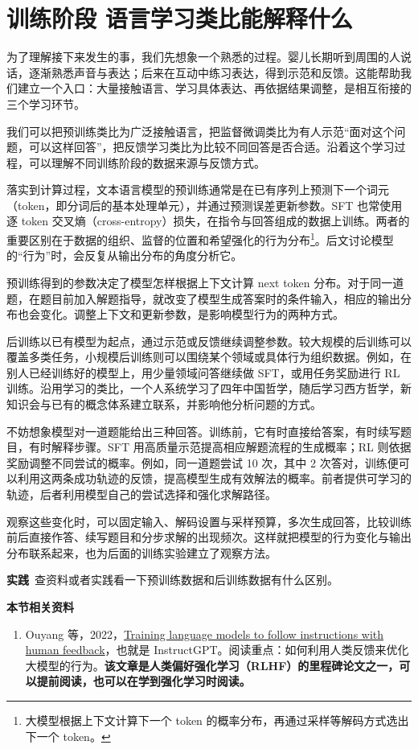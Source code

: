 \section{训练阶段 语言学习类比能解释什么}\label{训练阶段 语言学习类比能解释什么}

为了理解接下来发生的事，我们先想象一个熟悉的过程。婴儿长期听到周围的人说话，逐渐熟悉声音与表达；后来在互动中练习表达，得到示范和反馈。这能帮助我们建立一个入口：大量接触语言、学习具体表达、再依据结果调整，是相互衔接的三个学习环节。

我们可以把预训练类比为广泛接触语言，把监督微调类比为有人示范``面对这个问题，可以这样回答''，把反馈学习类比为比较不同回答是否合适。沿着这个学习过程，可以理解不同训练阶段的数据来源与反馈方式。

落实到计算过程，文本语言模型的预训练通常是在已有序列上预测下一个词元（token，即分词后的基本处理单元），并通过预测误差更新参数。SFT 也常使用逐 token 交叉熵（cross-entropy）损失，在指令与回答组成的数据上训练。两者的重要区别在于数据的组织、监督的位置和希望强化的行为分布\footnote{大模型根据上下文计算下一个 token 的概率分布，再通过采样等解码方式选出下一个 token。}。后文讨论模型的``行为''时，会反复从输出分布的角度分析它。

预训练得到的参数决定了模型怎样根据上下文计算 next token 分布。对于同一道题，在题目前加入解题指导，就改变了模型生成答案时的条件输入，相应的输出分布也会变化。调整上下文和更新参数，是影响模型行为的两种方式。

后训练以已有模型为起点，通过示范或反馈继续调整参数。较大规模的后训练可以覆盖多类任务，小规模后训练则可以围绕某个领域或具体行为组织数据。例如，在别人已经训练好的模型上，用少量领域问答继续做 SFT，或用任务奖励进行 RL 训练。沿用学习的类比，一个人系统学习了四年中国哲学，随后学习西方哲学，新知识会与已有的概念体系建立联系，并影响他分析问题的方式。

不妨想象模型对一道题能给出三种回答。训练前，它有时直接给答案，有时续写题目，有时解释步骤。SFT 用高质量示范提高相应解题流程的生成概率；RL 则依据奖励调整不同尝试的概率。例如，同一道题尝试 10 次，其中 2 次答对，训练便可以利用这两条成功轨迹的反馈，提高模型生成有效解法的概率。前者提供可学习的轨迹，后者利用模型自己的尝试选择和强化求解路径。

观察这些变化时，可以固定输入、解码设置与采样预算，多次生成回答，比较训练前后直接作答、续写题目和分步求解的出现频次。这样就把模型的行为变化与输出分布联系起来，也为后面的训练实验建立了观察方法。

\textbf{实践}~查资料或者实践看一下预训练数据和后训练数据有什么区别。

\textbf{本节相关资料}
\begin{enumerate}
    \item Ouyang 等，2022，\href{https://arxiv.org/abs/2203.02155}{Training language models to follow instructions with human feedback}，也就是 InstructGPT。阅读重点：如何利用人类反馈来优化大模型的行为。\textbf{该文章是人类偏好强化学习（RLHF）的里程碑论文之一，可以提前阅读，也可以在学到强化学习时阅读。}
\end{enumerate}
